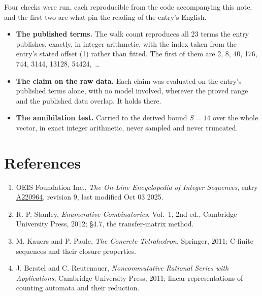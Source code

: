 \documentclass[11pt]{article}
\theoremstyle{definition}
\begin{document}
Four checks were run, each reproducible from the code accompanying this note, and the first two are what pin the reading of the entry's English.

\begin{itemize}

\item {\bfseries The published terms.} The walk count reproduces all 23 terms the entry publishes, exactly, in integer arithmetic, with the index taken from the entry's stated offset (1) rather than fitted. The first of them are 2, 8, 40, 176, 744, 3144, 13128, 54424,~\dots

\item {\bfseries The claim on the raw data.} Each claim was evaluated on the entry's published terms alone, with no model involved, wherever the proved range and the published data overlap. It holds there.

\item {\bfseries The annihilation test.} Carried to the derived bound $S = 14$ over the whole vector, in exact integer arithmetic, never sampled and never truncated.

\end{itemize}

\section{References}

\begin{enumerate}

\item OEIS Foundation Inc., \emph{The On-Line Encyclopedia of Integer Sequences}, entry \href{https://oeis.org/A220964}{A220964}, revision 9, last modified Oct 03 2025.

\item R. P. Stanley, \emph{Enumerative Combinatorics}, Vol.~1, 2nd ed., Cambridge University Press, 2012; \S4.7, the transfer-matrix method.

\item M. Kauers and P. Paule, \emph{The Concrete Tetrahedron}, Springer, 2011; C-finite sequences and their closure properties.

\item J. Berstel and C. Reutenauer, \emph{Noncommutative Rational Series with Applications}, Cambridge University Press, 2011; linear representations of counting automata and their reduction.

\end{enumerate}
\end{document}

